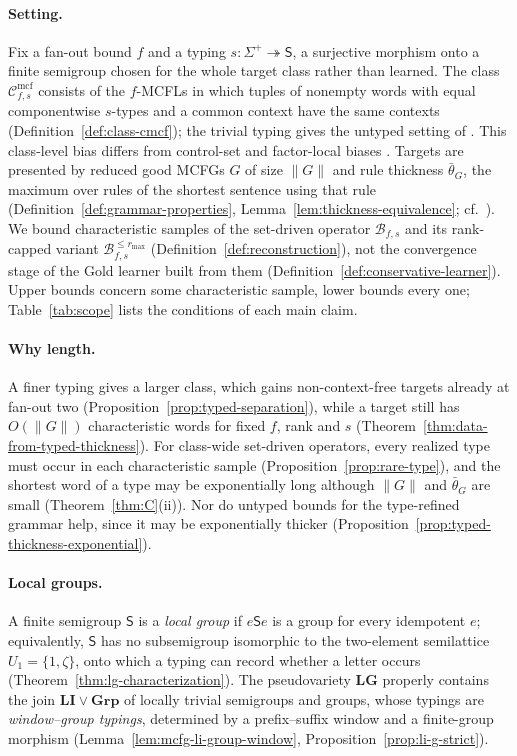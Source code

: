 \documentclass[11pt]{article}
\numberwithin{equation}{section}
\theoremstyle{plain}
\theoremstyle{definition}
\theoremstyle{remark}
\newcommand{\Cmcf}[2]{\mathcal{C}^{\mathrm{mcf}}_{#1,#2}}
\theoremstyle{plain}
\begin{document}
\paragraph{Setting.}
Fix a fan-out bound $f$ and a typing $s:\Sigma^+\twoheadrightarrow\mathsf S$,
a surjective morphism onto a finite semigroup chosen for the whole target
class rather than learned.  The class $\Cmcf{f}{s}$ consists of the
$f$-MCFLs in which tuples of nonempty words with equal componentwise
$s$-types and a common context have the same contexts
(Definition~\ref{def:class-cmcf}); the trivial typing gives the untyped
setting of \cite{Yoshinaka2011}.  This class-level bias
\cite{CosteTyping2004} differs from control-set and factor-local biases
\cite{Takada1988,Takada1995,CosteGaretNicolas2012,CosteNicolas2019}.  Targets
are presented by reduced good MCFGs $G$ of size $\|G\|$ and rule thickness
$\bar\theta_G$, the maximum over rules of the shortest sentence using that
rule (Definition~\ref{def:grammar-properties},
Lemma~\ref{lem:thickness-equivalence}; cf.~\cite{EyraudHeinzYoshinaka2016,kuriyamaCFG}).
We bound characteristic samples of the set-driven operator $\mathcal B_{f,s}$
and its rank-capped variant $\mathcal B^{\le r_{\max}}_{f,s}$
(Definition~\ref{def:reconstruction}), not the convergence stage of the Gold
learner built from them (Definition~\ref{def:conservative-learner}).  Upper
bounds concern some characteristic sample, lower bounds every one;
Table~\ref{tab:scope} lists the conditions of each main claim.

\paragraph{Why length.}
A finer typing gives a larger class, which gains non-context-free targets
already at fan-out two (Proposition~\ref{prop:typed-separation}), while a
target still has
$O(\|G\|)$ characteristic words for fixed $f$, rank and $s$
(Theorem~\ref{thm:data-from-typed-thickness}).  For class-wide set-driven operators, every realized type must occur in
each characteristic sample (Proposition~\ref{prop:rare-type}), and
the shortest word of a type may be exponentially long although $\|G\|$ and
$\bar\theta_G$ are small (Theorem~\ref{thm:C}(ii)).  Nor do untyped bounds for the
type-refined grammar help, since it may be exponentially thicker
(Proposition~\ref{prop:typed-thickness-exponential}).

\paragraph{Local groups.}
A finite semigroup $\mathsf S$ is a \emph{local group} if $e\mathsf Se$ is a
group for every idempotent $e$; equivalently, $\mathsf S$ has no subsemigroup
isomorphic to the two-element semilattice $U_1=\{1,\zeta\}$, onto which a
typing can record whether a letter occurs
(Theorem~\ref{thm:lg-characterization}).  The pseudovariety $\mathbf{LG}$
properly contains the join $\mathbf{LI}\vee\mathbf{Grp}$ of locally trivial
semigroups and groups, whose typings are
\emph{window--group typings}, determined by a prefix--suffix window and a
finite-group morphism (Lemma~\ref{lem:mcfg-li-group-window},
Proposition~\ref{prop:li-g-strict}).
\end{document}
